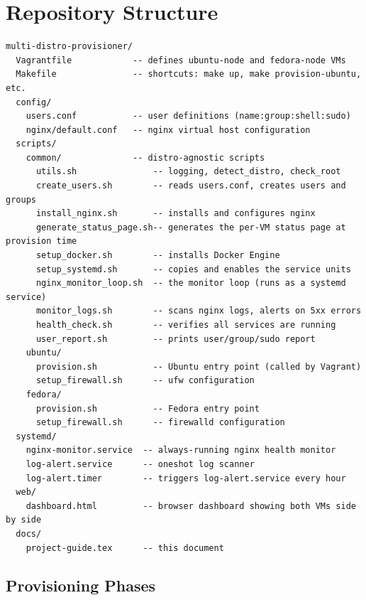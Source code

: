 \documentclass[11pt,a4paper]{article}
\begin{document}
\section{Repository Structure}
\label{sec:structure}

\begin{lstlisting}[caption={Top-level directory layout}]
multi-distro-provisioner/
  Vagrantfile            -- defines ubuntu-node and fedora-node VMs
  Makefile               -- shortcuts: make up, make provision-ubuntu, etc.
  config/
    users.conf           -- user definitions (name:group:shell:sudo)
    nginx/default.conf   -- nginx virtual host configuration
  scripts/
    common/              -- distro-agnostic scripts
      utils.sh               -- logging, detect_distro, check_root
      create_users.sh        -- reads users.conf, creates users and groups
      install_nginx.sh       -- installs and configures nginx
      generate_status_page.sh-- generates the per-VM status page at provision time
      setup_docker.sh        -- installs Docker Engine
      setup_systemd.sh       -- copies and enables the service units
      nginx_monitor_loop.sh  -- the monitor loop (runs as a systemd service)
      monitor_logs.sh        -- scans nginx logs, alerts on 5xx errors
      health_check.sh        -- verifies all services are running
      user_report.sh         -- prints user/group/sudo report
    ubuntu/
      provision.sh           -- Ubuntu entry point (called by Vagrant)
      setup_firewall.sh      -- ufw configuration
    fedora/
      provision.sh           -- Fedora entry point
      setup_firewall.sh      -- firewalld configuration
  systemd/
    nginx-monitor.service  -- always-running nginx health monitor
    log-alert.service      -- oneshot log scanner
    log-alert.timer        -- triggers log-alert.service every hour
  web/
    dashboard.html         -- browser dashboard showing both VMs side by side
  docs/
    project-guide.tex      -- this document
\end{lstlisting}

\subsection{Provisioning Phases}
\end{document}

